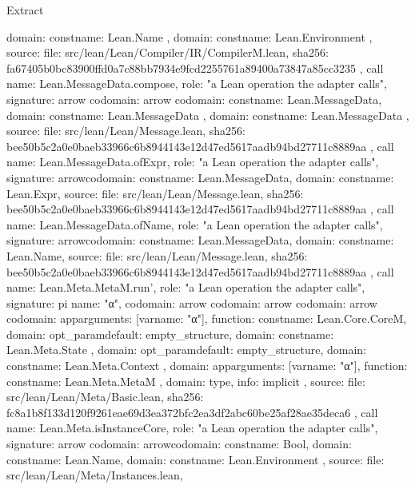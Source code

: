 \begin{lexlean}{Extract}
\begin{toolingmodule}
{{{{          domain: const{name: Lean.Name}
        },
        domain: const{name: Lean.Environment}
      },
      source: {
        file: src/lean/Lean/Compiler/IR/CompilerM.lean,
        sha256: fa67405b0bc83900ffd0a7c88bb7934e9fcd2255761a89400a73847a85cc3235
      }
    },
    call{
      name: Lean.MessageData.compose,
      role: "a Lean operation the adapter calls",
      signature: arrow{
        codomain: arrow{
          codomain: const{name: Lean.MessageData},
          domain: const{name: Lean.MessageData}
        },
        domain: const{name: Lean.MessageData}
      },
      source: {
        file: src/lean/Lean/Message.lean,
        sha256: bee50b5c2a0e0baeb33966c6b8944143e12d47ed5617aadb94bd27711c8889aa
      }
    },
    call{
      name: Lean.MessageData.ofExpr,
      role: "a Lean operation the adapter calls",
      signature: arrow{codomain: const{name: Lean.MessageData}, domain: const{name: Lean.Expr}},
      source: {
        file: src/lean/Lean/Message.lean,
        sha256: bee50b5c2a0e0baeb33966c6b8944143e12d47ed5617aadb94bd27711c8889aa
      }
    },
    call{
      name: Lean.MessageData.ofName,
      role: "a Lean operation the adapter calls",
      signature: arrow{codomain: const{name: Lean.MessageData}, domain: const{name: Lean.Name}},
      source: {
        file: src/lean/Lean/Message.lean,
        sha256: bee50b5c2a0e0baeb33966c6b8944143e12d47ed5617aadb94bd27711c8889aa
      }
    },
    call{
      name: Lean.Meta.MetaM.run',
      role: "a Lean operation the adapter calls",
      signature: pi{
        name: "α",
        codomain: arrow{
          codomain: arrow{
            codomain: arrow{
              codomain: app{arguments: [var{name: "α"}], function: const{name: Lean.Core.CoreM}},
              domain: opt_param{default: empty_structure{}, domain: const{name: Lean.Meta.State}}
            },
            domain: opt_param{default: empty_structure{}, domain: const{name: Lean.Meta.Context}}
          },
          domain: app{arguments: [var{name: "α"}], function: const{name: Lean.Meta.MetaM}}
        },
        domain: type{},
        info: implicit
      },
      source: {
        file: src/lean/Lean/Meta/Basic.lean,
        sha256: fc8a1b8f133d120f9261eae69d3ea372bfc2ea3df2abc60be25af28ae35deca6
      }
    },
    call{
      name: Lean.Meta.isInstanceCore,
      role: "a Lean operation the adapter calls",
      signature: arrow{
        codomain: arrow{codomain: const{name: Bool}, domain: const{name: Lean.Name}},
        domain: const{name: Lean.Environment}
      },
      source: {
        file: src/lean/Lean/Meta/Instances.lean,
}}}
\end{toolingmodule}
\end{lexlean}
